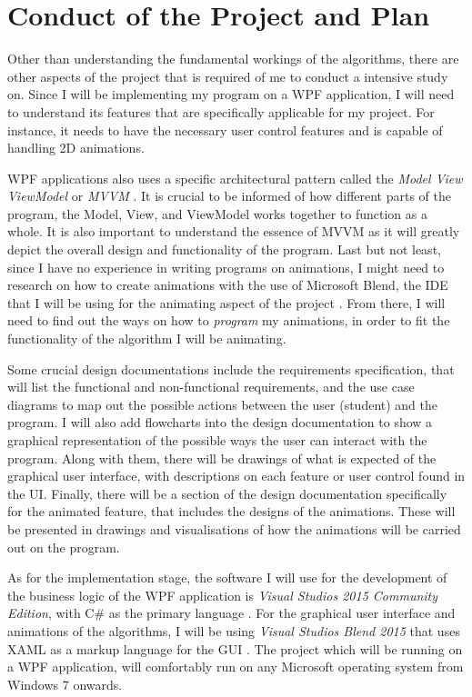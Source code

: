 \documentclass[12pt,a4paper,oneside]{report}
\begin{document}
\section*{Conduct of the Project and Plan}

Other than understanding the fundamental workings of the algorithms, there are other aspects of the project that is required of me to conduct a intensive study on. Since I will be implementing my program on a WPF application, I will need to understand its features that are specifically applicable for my project. For instance, it needs to have the necessary user control features and is capable of handling 2D animations. 

WPF applications also uses a specific architectural pattern called the \textit{Model View ViewModel} or \textit{MVVM} \nocite{_mvvm_2012}. It is crucial to be informed of how different parts of the program, the Model, View, and ViewModel works together to function as a whole. It is also important to understand the essence of MVVM as it will greatly depict the overall design and functionality of the program. Last but not least, since I have no experience in writing programs on animations, I might need to research on how to create animations with the use of Microsoft Blend, the IDE that I will be using for the animating aspect of the project \cite{tandon_simple_2007}. From there, I will need to find out the ways on how to \textit{program} my animations, in order to fit the functionality of the algorithm I will be animating.

Some crucial design documentations include the requirements specification, that will list the functional and non-functional requirements, and the use case diagrams to map out the possible actions between the user (student) and the program. I will also add flowcharts into the design documentation to show a graphical representation of the possible ways the user can interact with the program. Along with them, there will be drawings of what is expected of the graphical user interface, with descriptions on each feature or user control found in the UI. Finally, there will be a section of the design documentation specifically for the animated feature, that includes the designs of the animations. These will be presented in drawings and visualisations of how the animations will be carried out on the program.

As for the implementation stage, the software I will use for the development of the business logic of the WPF application is \textit{Visual Studios 2015 Community Edition}, with C\# as the primary language \cite{_windows_2015}. For the graphical user interface and animations of the algorithms, I will be using \textit{Visual Studios Blend 2015} that uses XAML as a markup language for the GUI \cite{_designing_2015}. The project which will be running on a WPF application, will comfortably run on any Microsoft operating system from Windows 7 onwards.
\end{document}
